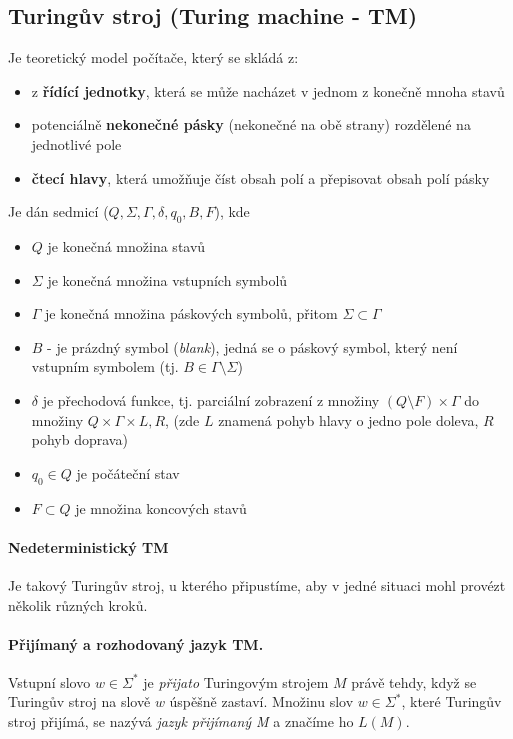 \label{heading:tm}
\subsection*{Turingův stroj (Turing machine - TM)}
Je teoretický model počítače, který se skládá z:

\begin{itemize}[itemsep=0pt]
    \item z \textbf{řídící jednotky}, která se může nacházet v jednom z konečně mnoha stavů
    \item potenciálně \textbf{nekonečné pásky} (nekonečné na obě strany) rozdělené na jednotlivé pole
    \item \textbf{čtecí hlavy}, která umožňuje číst obsah polí a přepisovat obsah polí pásky
\end{itemize}

\noindent Je dán sedmicí ($Q,\Sigma, \Gamma, \delta, 
q_0, B, F$), kde

\begin{itemize}[itemsep=0pt]
    \item $Q$ je konečná množina stavů
    \item $\Sigma$ je konečná množina vstupních symbolů
    \item $\Gamma$ je konečná množina páskových symbolů, přitom $\Sigma \subset \Gamma$
    \item $B$ - je prázdný symbol (\textit{blank}), jedná se o páskový symbol, který není vstupním symbolem (tj. $B \in \Gamma \setminus \Sigma$)
    \item $\delta$ je přechodová funkce, tj. parciální zobrazení z množiny $(Q \setminus F) \times \Gamma$ do množiny $Q \times \Gamma \times {L,R}$, (zde $L$ znamená pohyb hlavy o jedno pole doleva, $R$ pohyb doprava)
    \item $q_0 \in Q$ je počáteční stav
    \item $F \subset Q$ je množina koncových stavů
\end{itemize}

\paragraph{Nedeterministický TM} Je takový Turingův stroj, u kterého připustíme, aby v jedné situaci mohl provézt několik různých kroků.

\paragraph{Přijímaný a rozhodovaný jazyk TM.} Vstupní slovo $w \in \Sigma^*$ je \textit{přijato} Turingovým strojem $M$ právě tehdy, když se Turingův stroj na slově $w$ úspěšně zastaví. Množinu slov $w \in \Sigma^*$, které Turingův stroj přijímá, se nazývá \textit{jazyk přijímaný M} a značíme ho $L(M)$.

